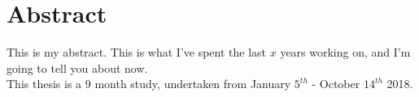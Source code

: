\chapter{Abstract}

This is my abstract.  This is what I've spent the last $x$ years working on,
and I'm going to tell you about now.\\

This thesis is a 9 month study, undertaken from January $5^{th}$ - October $14^{th}$ 2018. 

